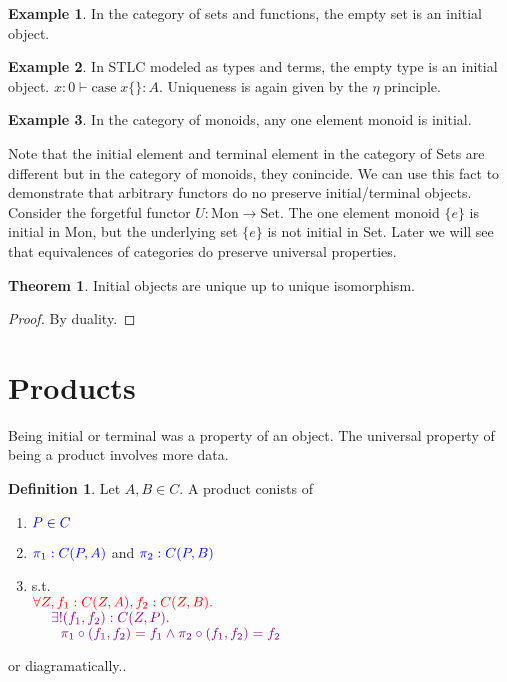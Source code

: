 \documentclass[12pt]{article}
\theoremstyle{definition}
\newtheorem{theorem}{Theorem}[section]
\newtheorem{example}{Example}[section]
\newtheorem{definition}{Definition}[section]
\newcommand{\purple}[1]{\textcolor{violet}{#1}}
\begin{document}
\begin{example}
    In the category of sets and functions, the empty set is an initial object.
\end{example}

\begin{example}
    In STLC modeled as types and terms, the empty type is an initial object. $x : 0 \vdash \textrm{case}\; x\{\} : A$. Uniqueness is again given by the $\eta$ principle.
\end{example}

\begin{example}
    In the category of monoids, any one element monoid is initial.
\end{example}


    Note that the initial element and terminal element in the category of Sets are different but in the category of monoids, they conincide. We can use this fact to demonstrate that arbitrary functors do no preserve initial/terminal objects. Consider the forgetful functor $U : \textrm{Mon} \to \textrm{Set}$. The one element monoid $\{e\}$ is initial in Mon, but the underlying set $\{e\}$ is not initial in Set. Later we will see that equivalences of categories do preserve universal properties.

    \begin{theorem}
        Initial objects are unique up to unique isomorphism.
    \end{theorem}
    \begin{proof}
        By duality.
    \end{proof}

\section{Products}
Being initial or terminal was a property of an object. The universal property of being a product involves more data.

\begin{definition}
    Let $A,B \in C$. A product conists of 
    \begin{enumerate}
        \item $\textcolor{blue}{P \in C}$
        \item $\textcolor{blue}{\pi_1 : C(P,A)}$ and $\textcolor{blue}{\pi_2 : C(P,B)}$
        \item s.t. \\$\textcolor{red}{\forall Z,f_1:C(Z,A),f_2:C(Z,B).\;}$\\
        $\text{\quad}\ \purple{\exists!(f_1,f_2):C(Z,P).}$\\
        $\text{\quad\quad}\purple{\pi_1 \circ (f_1,f_2)=f_1 \land \pi_2 \circ (f_1,f_2) = f_2}$
    \end{enumerate}
\end{definition}
or diagramatically.. 
\end{document}
